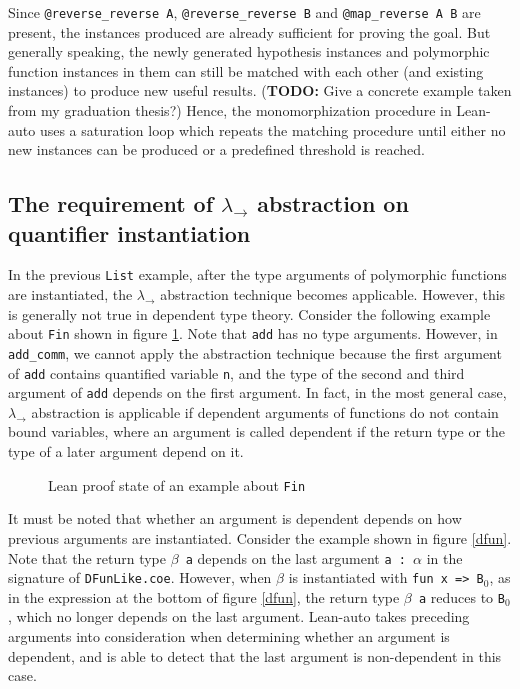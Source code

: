 \noindent Since \texttt{@reverse\_reverse A}, \texttt{@reverse\_reverse B} and \texttt{@map\_reverse A B}
are present, the instances produced are already sufficient for proving the goal.
But generally speaking, the newly generated hypothesis instances and polymorphic function instances
in them can still be matched with each other (and existing instances) to produce new useful results.
(\textbf{TODO:} Give a concrete example taken from my graduation thesis?)
Hence, the monomorphization procedure in Lean-auto uses a saturation loop which
repeats the matching procedure until either no new instances can be produced or a predefined
threshold is reached.

\subsection{The requirement of $\lambda_\to$ abstraction on quantifier instantiation} \label{exqdet}

In the previous \texttt{List} example, after the type arguments of polymorphic functions
are instantiated, the $\lambda_\to$ abstraction technique becomes applicable. However, this is
generally not true in dependent type theory. Consider the following example about \texttt{Fin} shown
in figure \ref{leanfinexplicit}. Note that \texttt{add} has no type arguments. However, in
\texttt{add\_comm}, we cannot apply the abstraction technique because the first argument of
\texttt{add} contains quantified variable \texttt{n}, and the type of the second and third argument
of \texttt{add} depends on the first argument. In fact, in the most general case, $\lambda_\to$
abstraction is applicable if dependent arguments of functions do not contain bound variables,
where an argument is called dependent if the return type or the type of a later argument depend on it.

\begin{figure}
  \begin{CenteredBox}
    
  \end{CenteredBox}
  \caption{Lean proof state of an example about \texttt{Fin}}
  \label{leanfinexplicit}
\end{figure}

\noindent It must be noted that whether an argument is dependent depends on how previous arguments
are instantiated. Consider the example shown in figure \ref{dfun}. Note that the return
type \texttt{$\beta$ a} depends on the last argument \texttt{a : $\alpha$} in the signature of
\texttt{DFunLike.coe}. However, when $\beta$ is instantiated with \texttt{fun x => B$_0$}, as in the
expression at the bottom of figure \ref{dfun}, the return type \texttt{$\beta$ a} reduces to \texttt{B$_0$},
which no longer depends on the last argument. Lean-auto takes preceding arguments into
consideration when determining whether an argument is dependent, and is able to detect
that the last argument is non-dependent in this case.

